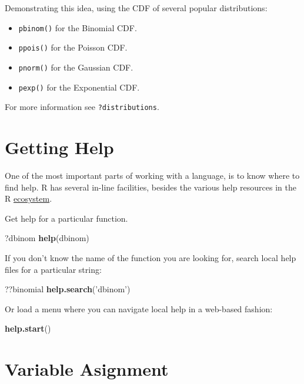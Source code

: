 \documentclass[]{book}
\newenvironment{Shaded}{\begin{snugshade}}{\end{snugshade}}
\newcommand{\KeywordTok}[1]{\textcolor[rgb]{0.13,0.29,0.53}{\textbf{#1}}}
\newcommand{\StringTok}[1]{\textcolor[rgb]{0.31,0.60,0.02}{#1}}
\newcommand{\NormalTok}[1]{#1}
\providecommand{\tightlist}{%
  \setlength{\itemsep}{0pt}\setlength{\parskip}{0pt}}
\theoremstyle{definition}
\theoremstyle{definition}
\theoremstyle{definition}
\theoremstyle{remark}
\begin{document}
Demonstrating this idea, using the CDF of several popular distributions:

\begin{itemize}
\tightlist
\item
  \texttt{pbinom()} for the Binomial CDF.
\item
  \texttt{ppois()} for the Poisson CDF.
\item
  \texttt{pnorm()} for the Gaussian CDF.
\item
  \texttt{pexp()} for the Exponential CDF.
\end{itemize}

For more information see \texttt{?distributions}.

\section{Getting Help}\label{getting-help}

One of the most important parts of working with a language, is to know
where to find help. R has several in-line facilities, besides the
various help resources in the R
\protect\hyperlink{ecosystem}{ecosystem}.

Get help for a particular function.

\begin{Shaded}
\begin{Highlighting}[]
\NormalTok{?dbinom }
\KeywordTok{help}\NormalTok{(dbinom)}
\end{Highlighting}
\end{Shaded}

If you don't know the name of the function you are looking for, search
local help files for a particular string:

\begin{Shaded}
\begin{Highlighting}[]
\NormalTok{??binomial}
\KeywordTok{help.search}\NormalTok{(}\StringTok{'dbinom'}\NormalTok{) }
\end{Highlighting}
\end{Shaded}

Or load a menu where you can navigate local help in a web-based fashion:

\begin{Shaded}
\begin{Highlighting}[]
\KeywordTok{help.start}\NormalTok{() }
\end{Highlighting}
\end{Shaded}

\section{Variable Asignment}\label{variable-asignment}
\end{document}
